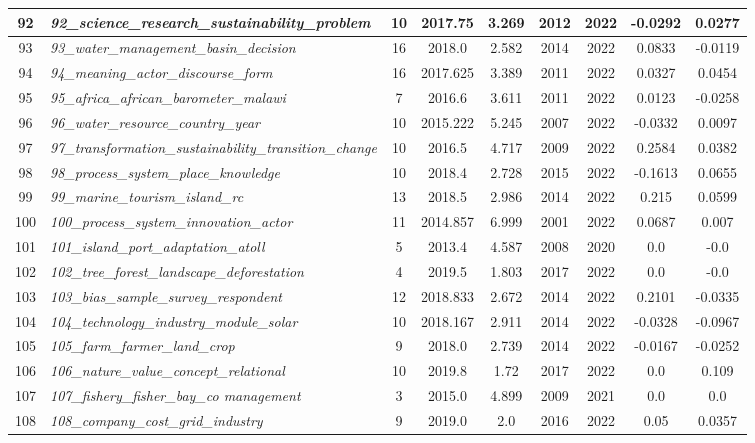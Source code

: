 \documentclass[12pt]{article}
\begin{document}
\begin{landscape}
\begin{scriptsize}
\begin{longtable}{|>{\scriptsize}c|p{6cm}|c|c|c|c|c|c|c|}
92 & \textit{92\_science\_research\_sustainability\_problem} & 10 & 2017.75 & 3.269 & 2012 & 2022 & -0.0292 & 0.0277 \\ \hline
93 & \textit{93\_water\_management\_basin\_decision} & 16 & 2018.0 & 2.582 & 2014 & 2022 & 0.0833 & -0.0119 \\ \hline
94 & \textit{94\_meaning\_actor\_discourse\_form} & 16 & 2017.625 & 3.389 & 2011 & 2022 & 0.0327 & 0.0454 \\ \hline
95 & \textit{95\_africa\_african\_barometer\_malawi} & 7 & 2016.6 & 3.611 & 2011 & 2022 & 0.0123 & -0.0258 \\ \hline
96 & \textit{96\_water\_resource\_country\_year} & 10 & 2015.222 & 5.245 & 2007 & 2022 & -0.0332 & 0.0097 \\ \hline
97 & \textit{97\_transformation\_sustainability\_transition\_change} & 10 & 2016.5 & 4.717 & 2009 & 2022 & 0.2584 & 0.0382 \\ \hline
98 & \textit{98\_process\_system\_place\_knowledge} & 10 & 2018.4 & 2.728 & 2015 & 2022 & -0.1613 & 0.0655 \\ \hline
99 & \textit{99\_marine\_tourism\_island\_rc} & 13 & 2018.5 & 2.986 & 2014 & 2022 & 0.215 & 0.0599 \\ \hline
100 & \textit{100\_process\_system\_innovation\_actor} & 11 & 2014.857 & 6.999 & 2001 & 2022 & 0.0687 & 0.007 \\ \hline
101 & \textit{101\_island\_port\_adaptation\_atoll} & 5 & 2013.4 & 4.587 & 2008 & 2020 & 0.0 & -0.0 \\ \hline
102 & \textit{102\_tree\_forest\_landscape\_deforestation} & 4 & 2019.5 & 1.803 & 2017 & 2022 & 0.0 & -0.0 \\ \hline
103 & \textit{103\_bias\_sample\_survey\_respondent} & 12 & 2018.833 & 2.672 & 2014 & 2022 & 0.2101 & -0.0335 \\ \hline
104 & \textit{104\_technology\_industry\_module\_solar} & 10 & 2018.167 & 2.911 & 2014 & 2022 & -0.0328 & -0.0967 \\ \hline
105 & \textit{105\_farm\_farmer\_land\_crop} & 9 & 2018.0 & 2.739 & 2014 & 2022 & -0.0167 & -0.0252 \\ \hline
106 & \textit{106\_nature\_value\_concept\_relational} & 10 & 2019.8 & 1.72 & 2017 & 2022 & 0.0 & 0.109 \\ \hline
107 & \textit{107\_fishery\_fisher\_bay\_co management} & 3 & 2015.0 & 4.899 & 2009 & 2021 & 0.0 & 0.0 \\ \hline
108 & \textit{108\_company\_cost\_grid\_industry} & 9 & 2019.0 & 2.0 & 2016 & 2022 & 0.05 & 0.0357 \\ \hline

\end{longtable}
\end{scriptsize}
\end{landscape}
\end{document}
